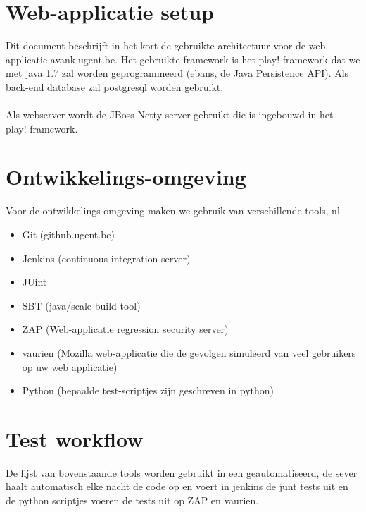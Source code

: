 \documentclass[10pt,a4paper]{report}
\author{Sander Demeester}
\begin{document}
\section*{Web-applicatie setup}
Dit document beschrijft in het kort de gebruikte architectuur voor de web applicatie avank.ugent.be.
Het gebruikte framework is het play!-framework dat we met java 1.7 zal worden geprogrammeerd (ebans, de Java Persistence API). Als back-end database zal postgresql worden gebruikt.\\
\\
Als webserver wordt de JBoss Netty server gebruikt die is ingebouwd in het play!-framework.
\section*{Ontwikkelings-omgeving}
Voor de ontwikkelings-omgeving maken we gebruik van verschillende tools, nl
\begin{itemize}
\item Git (github.ugent.be)
\item Jenkins (continuous integration server)
\item JUint
\item SBT (java/scale build tool)
\item ZAP (Web-applicatie regression security server)
\item vaurien (Mozilla web-applicatie die de gevolgen simuleerd van veel gebruikers op uw web applicatie)
\item Python (bepaalde test-scriptjes zijn geschreven in python)
\end{itemize}
\section*{Test workflow}
De lijst van bovenstaande tools worden gebruikt in een geautomatiseerd, de sever haalt automatisch elke nacht de code op en voert in jenkins de junt tests uit en de python scriptjes voeren de tests uit op ZAP en vaurien.
\end{document}
